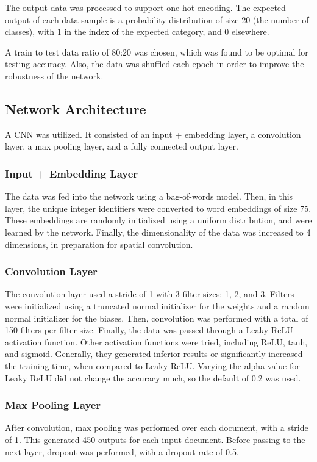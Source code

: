 \documentclass{article}
\begin{document}
The output data was processed to support one hot encoding. The expected output of each data sample is a probability distribution of size
20 (the number of classes), with 1 in the index of the expected category, and 0 elsewhere.

A train to test data ratio of 80:20 was chosen, which was found to be optimal for testing accuracy. Also, the data was shuffled each epoch
in order to improve the robustness of the network.

\subsection{Network Architecture}
A CNN was utilized. It consisted of an input + embedding layer, a convolution layer, a max pooling layer, and a fully connected output layer.

\subsubsection{Input + Embedding Layer}
The data was fed into the network using a bag-of-words model. Then, in this layer, the unique integer identifiers were
converted to word embeddings of size 75. These embeddings are randomly initialized using a uniform distribution, and were learned by the
network. Finally, the dimensionality of the data was increased to 4 dimensions, in preparation for spatial convolution.

\subsubsection{Convolution Layer}
The convolution layer used a stride of 1 with 3 filter sizes: 1, 2, and 3. Filters were initialized using a truncated normal initializer for
the weights and a random normal initializer for the biases. Then, convolution was performed with a total of 150 filters
per filter size. Finally, the data was passed through a Leaky ReLU activation function. Other activation functions were tried,
including ReLU, tanh, and sigmoid. Generally, they generated inferior results or significantly increased the training time, when compared
to Leaky ReLU. Varying the alpha value for Leaky ReLU did not change the accuracy much, so the default of 0.2 was used.

\subsubsection{Max Pooling Layer}
After convolution, max pooling was performed over each document, with a stride of 1. This generated 450 outputs for each input document.
Before passing to the next layer, dropout was performed, with a dropout rate of 0.5.
\end{document}
